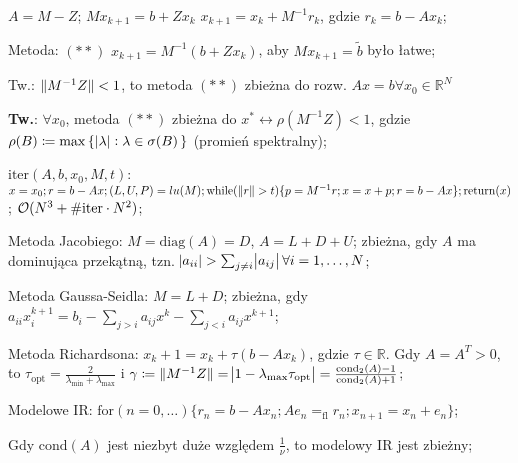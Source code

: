 
\entry
$A=M-Z$;
\entry
$Mx_{k+1}=b+Zx_{k}$
\entry
$x_{k+1}=x_k+M^{-1}r_k$, gdzie $r_k=b-Ax_k$;

\entry
Metoda: $\mathrm{(**)}$ $x_{k+1}=M^{-1}(b+Zx_k)$,
aby $Mx_{k+1}=\tilde{b}$ było łatwe;

\entry
Tw.: $\|M^{-1}Z\| < 1$,
to metoda $\mathrm{(**)}$ zbieżna do rozw. $Ax=b \forall x_0 \in \mathbb{R}^N$

\entry
\textbf{Tw.}:
$\forall x_0$,
metoda $\mathrm{(**)}$
zbieżna do $x^* \leftrightarrow \rho(M^{-1}Z) < 1$,
gdzie $\rho(B) \coloneqq \max\set{\abs{\lambda} : \lambda \in \sigma(B)}$
(promień spektralny);

\entry
$\mathrm{iter}(A,b,x_0,M,t)$:
$x=x_0;
r=b - Ax;
(L,U,P) = lu(M);
\mathrm{while}(\|r\| > t) \{
    p = M^{-1}r;
    x=x+p;
    r=b-Ax
\};
\mathrm{return}(x)
$;
$\mathcal{O}(N^3 + \mathrm{\#iter} \cdot N^2)$;

\entry
Metoda Jacobiego:
$M=\mathrm{diag}(A) = D$, $A=L+D+U$;
zbieżna, gdy $A$ ma dominująca przekątną,
tzn. $\abs{a_{ii}} > \sum_{j\neq i}\abs{a_{ij}} \forall i=1, \ldots, N$;

\entry
Metoda Gaussa-Seidla:
$M = L + D$;
zbieżna, gdy $a_{ii}x_i^{k+1}=b_i-\sum_{j>i}a_{ij}x^k-\sum_{j<i}a_{ij}x^{k+1}$;

\entry
Metoda Richardsona:
$x_k+1 = x_k + \tau(b-Ax_k)$, gdzie $\tau\in\mathbb{R}$.
Gdy $A=A^T>0$,
to $\tau_{\mathrm{opt}}=\frac{2}{\lambda_{\mathrm{min}} + \lambda_{\mathrm{max}} }$
i $\gamma \coloneqq \|M^{-1}Z\|=\abs{1-\lambda_{\mathrm{max}}\tau_{\mathrm{opt}}}=\frac{\mathrm{cond}_2(A)-1}{\mathrm{cond}_2(A) + 1}$;

\entry
Modelowe IR:
$\mathrm{for}(n=0,\ldots)\{ r_n=b-Ax_n; Ae_n=_{\mathrm{fl}}r_n; x_{n+1} = x_n + e_n \}$;


\entry
Gdy $\mathrm{cond}(A)$ jest niezbyt duże względem $\frac{1}{\nu}$, to modelowy IR jest zbieżny;

